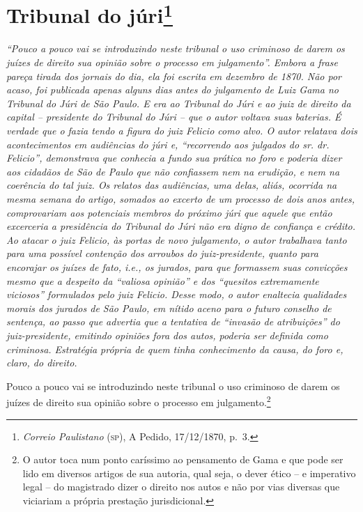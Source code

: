 {\chapter{Tribunal do júri\footnote{\emph{Correio Paulistano} (\textsc{sp}), A Pedido, 17/12/1870,
  p.~3.}} %

\begin{didascalia}
\emph{``Pouco a pouco vai se introduzindo neste tribunal o uso criminoso
de darem os juízes de direito sua opinião sobre o processo em
julgamento''. Embora a frase pareça tirada dos jornais do dia, ela foi
escrita em dezembro de 1870. Não por acaso, foi publicada apenas alguns
dias antes do julgamento de Luiz Gama no Tribunal do Júri de São Paulo.
E era ao Tribunal do Júri e ao juiz de direito da capital -- presidente
do Tribunal do Júri -- que o autor voltava suas baterias. É verdade que
o fazia tendo a figura do juiz Felicio como alvo. O autor relatava dois
acontecimentos em audiências do júri e, ``recorrendo aos julgados do sr.
dr. Felicio'', demonstrava que conhecia a fundo sua prática no foro e
poderia dizer aos cidadãos de São de Paulo que não confiassem nem na
erudição, e nem na coerência do tal juiz. Os relatos das audiências, uma
delas, aliás, ocorrida na mesma semana do artigo, somados ao excerto de
um processo de dois anos antes, comprovariam aos potenciais membros do
próximo júri que aquele que então excerceria a presidência do Tribunal
do Júri não era digno de confiança e crédito. Ao atacar o juiz Felicio,
às portas de novo julgamento, o autor trabalhava tanto para uma possível
contenção dos arroubos do juiz-presidente, quanto para encorajar os
juízes de fato, i.e., os jurados, para que formassem suas convicções
mesmo que a despeito da ``valiosa opinião'' e dos ``quesitos extremamente
viciosos'' formulados pelo juiz Felicio. Desse modo, o autor enaltecia
qualidades morais dos jurados de São Paulo, em nítido aceno para o
futuro conselho de sentença, ao passo que advertia que a tentativa de
``invasão de atribuições'' do juiz-presidente, emitindo opiniões fora dos
autos, poderia ser definida como criminosa. Estratégia própria de quem
tinha conhecimento da causa, do foro e, claro, do direito.}
\end{didascalia}

Pouco a pouco vai se introduzindo neste tribunal o uso criminoso de
darem os juízes de direito sua opinião sobre o processo em
julgamento.\footnote{ O autor toca num ponto caríssimo ao pensamento de
  Gama e que pode ser lido em diversos artigos de sua autoria, qual
  seja, o dever ético -- e imperativo legal -- do magistrado dizer o
  direito nos autos e não por vias diversas que viciariam a própria
  prestação jurisdicional.}

}
